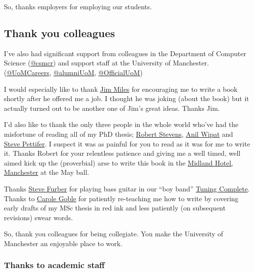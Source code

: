 \documentclass[
]{book}
\begin{document}
So, thanks employers for employing our students. 🙏

\hypertarget{colleagues}{%
\subsection{Thank you colleagues}\label{colleagues}}

I've also had significant support from colleagues in the Department of Computer Science (\href{https://twitter.com/csmcr}{@csmcr}) and support staff at the University of Manchester. (\href{https://twitter.com/UoMCareers}{@UoMCareers}, \href{https://twitter.com/alumniUoM}{@alumniUoM}, \href{https://twitter.com/OfficialUoM}{@OfficialUoM})

I would especially like to thank \href{https://en.wikipedia.org/wiki/James_John_Miles}{Jim Miles} for encouraging me to write a book shortly after he offered me a job. I thought he was joking (about the book) but it actually turned out to be another one of Jim's great ideas. Thanks Jim. 🙏

I'd also like to thank the only three people in the whole world who've had the misfortune of reading all of my PhD thesis; \href{https://en.wikipedia.org/wiki/Robert_David_Stevens}{Robert Stevens}, \href{https://www.ncl.ac.uk/computing/staff/profile/anilwipat.html}{Anil Wipat} and \href{https://en.wikipedia.org/wiki/Steve_Pettifer}{Steve Pettifer}. I suspect it was as painful for you to read as it was for me to write it. Thanks Robert for your relentless patience and giving me a well timed, well aimed kick up the (proverbial) arse to write this book in the \href{https://en.wikipedia.org/wiki/Midland_Hotel,_Manchester}{Midland Hotel, Manchester} at the May ball.

Thanks \href{https://en.wikipedia.org/wiki/Steve_Furber}{Steve Furber} for playing bass guitar in our ``boy band'' \href{http://www.cs.man.ac.uk/~hulld/research.html\#tuningcomplete}{Tuning Complete}. Thanks to \href{https://en.wikipedia.org/wiki/Carole_Goble}{Carole Goble} for patiently re-teaching me how to write by covering early drafts of my MSc thesis in red ink and less patiently (on subsequent revisions) swear words. 🤬

So, thank you colleagues for being collegiate. You make the University of Manchester an enjoyable place to work.

\hypertarget{academia}{%
\subsubsection{Thanks to academic staff}\label{academia}}
\end{document}
